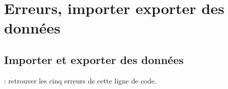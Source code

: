 \section{Erreurs, importer exporter des données}
\subsection{Importer et exporter des données}

 : retrouver les cinq erreurs de cette ligne de code.

